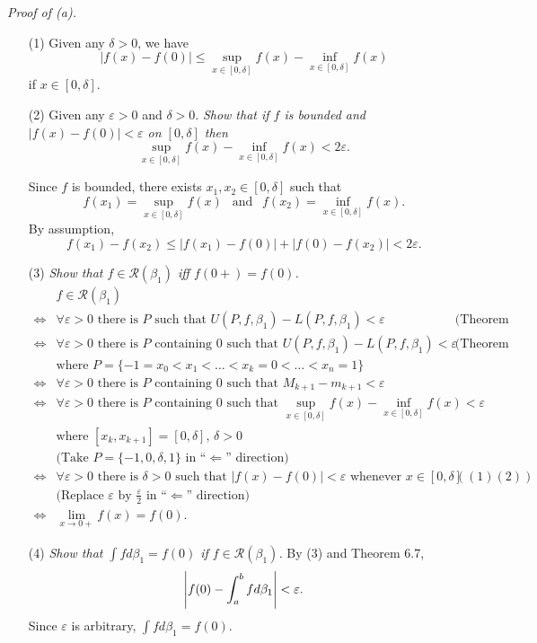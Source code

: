 \documentclass{article}
\begin{document}
\emph{Proof of (a).}
\begin{enumerate}
\item[(1)]
  Given any $\delta > 0$,
  we have
  \[
    |f(x) - f(0)| \leq \sup_{x\in[0,\delta]} f(x) - \inf_{x\in[0,\delta]} f(x)
  \]
  if $x \in [0,\delta]$.

\item[(2)]
  Given any $\varepsilon > 0$ and $\delta > 0$.
  \emph{Show that if $f$ is bounded and $|f(x) - f(0)| < \varepsilon$ on $[0,\delta]$ then
  \[
    \sup_{x\in[0,\delta]} f(x) - \inf_{x\in[0,\delta]} f(x) < 2\varepsilon.
  \]}

  Since $f$ is bounded, there exists $x_1,x_2 \in [0,\delta]$
  such that
  \[
    f(x_1) = \sup_{x\in[0,\delta]} f(x) \:\: \text{ and } \:\:
    f(x_2) = \inf_{x\in[0,\delta]} f(x).
  \]
  By assumption,
  \[
    f(x_1) - f(x_2) \leq |f(x_1) - f(0)| + |f(0) - f(x_2)| < 2\varepsilon.
  \]

\item[(3)]
\emph{Show that $f \in \mathscr{R}(\beta_1)$ iff $f(0+) = f(0)$.}
  \begin{align*}
    &f \in \mathscr{R}(\beta_1) \\
    \Longleftrightarrow&
      \text{$\forall \varepsilon > 0$ there is $P$ such that
      $U(P,f,\beta_1) - L(P,f,\beta_1) < \varepsilon$}
        &\text{(Theorem 6.6)} \\
    \Longleftrightarrow&
      \text{$\forall \varepsilon > 0$ there is $P$ containing $0$ such that
      $U(P,f,\beta_1) - L(P,f,\beta_1) < \varepsilon$}
        &\text{(Theorem 6.4)} \\
      &\text{where $P = \{-1 = x_0 < x_1 < \ldots < x_k = 0 < \ldots < x_n = 1\}$} \\
    \Longleftrightarrow&
      \text{$\forall \varepsilon > 0$ there is $P$ containing $0$ such that
      $M_{k+1} - m_{k+1} < \varepsilon$} \\
    \Longleftrightarrow&
      \text{$\forall \varepsilon > 0$ there is $P$ containing $0$ such that
      $\sup_{x\in[0,\delta]} f(x) - \inf_{x\in[0,\delta]} f(x) < \varepsilon$} \\
      &\text{where $[x_k,x_{k+1}] = [0,\delta]$, $\delta > 0$} \\
      &\text{(Take $P = \{-1,0,\delta,1\}$ in ``$\Longleftarrow$'' direction)} \\
    \Longleftrightarrow&
      \text{$\forall \varepsilon > 0$ there is $\delta > 0$ such that
      $|f(x) - f(0)| < \varepsilon$ whenever $x \in [0,\delta]$}
        &((1)(2)) \\
      &\text{(Replace $\varepsilon$ by $\frac{\varepsilon}{2}$ in ``$\Longleftarrow$'' direction)} \\
    \Longleftrightarrow&
      \lim_{x \to 0+} f(x) = f(0).
  \end{align*}

\item[(4)]
  \emph{Show that $\int f d\beta_1 = f(0)$ if $f \in \mathscr{R}(\beta_1)$.}
  By (3) and Theorem 6.7,
  \[
    \abs{ f(0) - \int_{a}^{b} f d\beta_1 } < \varepsilon.
  \]
  Since $\varepsilon$ is arbitrary, $\int f d\beta_1 = f(0)$.
\end{enumerate}
\end{document}
